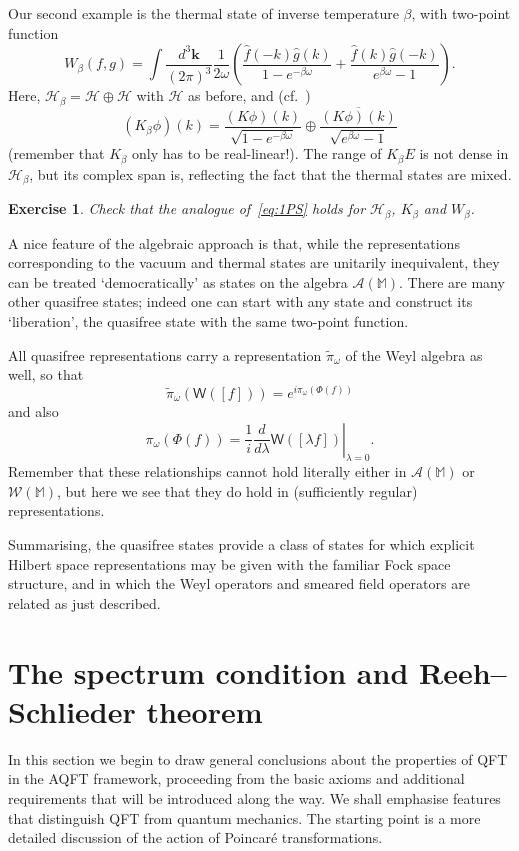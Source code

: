 \documentclass[12pt,a4paper]{article}
\newcommand{\1}{\mathds{1}}                         %
\newcommand{\MM}{\mathbb{M}}
\newcommand{\HH}{{\mathcal{H}}}
\newcommand{\kb}{{\boldsymbol{k}}}
\newcommand{\Ac}{{\mathcal{A}}}
\newcommand{\Wc}{{\mathcal{W}}}
\newcommand{\Ws}{{\mathsf{W}}}
\newtheorem{exercise}[theorem]{Exercise}
\begin{document}
Our second example is the thermal state of inverse temperature $\beta$, with two-point function
\[
W_\beta(f,g) = \int\frac{d^3\kb}{(2\pi)^3}\frac{1}{2\omega} \left(\frac{\hat{f}(-k) \hat{g}(k)}{1-e^{-\beta \omega}} +
\frac{\hat{f}(k) \hat{g}(-k)}{e^{\beta \omega}-1}\right).
\]
Here, $\HH_\beta=\HH\oplus\HH$ with $\HH$ as before, and (cf.~\cite{Kay:1985a})
\[
(K_\beta \phi)(k) = \frac{(K\phi)(k)}{\sqrt{1-e^{-\beta\omega}}} \oplus  \frac{\overline{(K\phi)(k)}}{\sqrt{e^{\beta\omega}-1}} 
\]
(remember that $K_\beta$ only has to be real-linear!). The range of $K_\beta E$ is not dense in $\HH_\beta$, but its complex span is, reflecting the fact that the thermal states are mixed.
\begin{exercise}
	Check that the analogue of~\eqref{eq:1PS} holds for $\HH_\beta$, $K_\beta$ and $W_\beta$.
\end{exercise}

A nice feature of the algebraic approach is that, while the representations corresponding to the vacuum and thermal states are unitarily inequivalent, they can be treated `democratically' as states on the algebra $\Ac(\MM)$. There are many other quasifree states; indeed one can start with any state and construct its `liberation', the quasifree state with the same two-point function.

All quasifree representations carry a representation $\tilde{\pi}_\omega$ of the Weyl algebra as well, 
so that
\[
\tilde{\pi}_\omega(\Ws([f])) = e^{i\pi_\omega(\Phi(f))}
\]
and also 
\[
\pi_\omega(\Phi(f)) = \left.\frac{1}{i}\frac{d}{d\lambda} \Ws([\lambda f])\right|_{\lambda=0}.
\]
Remember that these relationships cannot hold literally either in $\Ac(\MM)$ or $\Wc(\MM)$, but here we see that they do hold in (sufficiently regular) representations.

Summarising, the quasifree states provide a class of states for which explicit Hilbert space representations may be given with the familiar Fock space structure, and in which the Weyl operators and smeared field operators are related as just described.

\section{The spectrum condition and Reeh--Schlieder theorem} \label{sec:spectrum}

In this section we begin to draw general conclusions about the properties of QFT in the AQFT framework, proceeding from the basic axioms and additional requirements that will be introduced along the way. We shall emphasise features that distinguish QFT from quantum mechanics. The starting point is a more detailed discussion of the action of Poincar\'e transformations.
\end{document}
